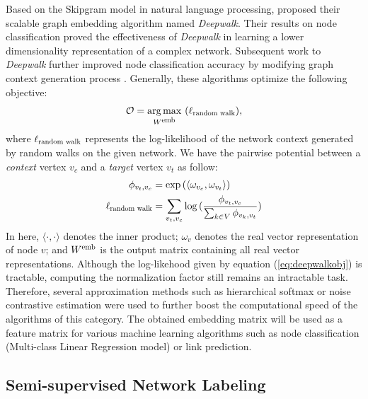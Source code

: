 \documentclass{article}
\DeclareMathOperator*{\argmax}{arg\,max}
\theoremstyle{definition}
\begin{document}
Based on the Skipgram model \cite{skipgram} in natural language 
processing, \citeauthor{deepwalk} proposed their scalable graph embedding 
algorithm named \emph{Deepwalk}. Their results on node classification proved the 
effectiveness of \emph{Deepwalk} in learning a lower dimensionality 
representation of a complex network. Subsequent work to \emph{Deepwalk} further 
improved node classification accuracy by modifying graph context 
generation process \cite{line,grarep,planetoid,node2vec}. Generally, these
algorithms optimize the following objective:
\begin{equation} 
\mathcal{O} = \argmax_{W^{\scalebox{0.75}{emb}}}\ ( 
\ell_{\scalebox{0.75}{random walk}}),
\label{eq:deepwalkobj}
\end{equation}
where $\ell_{\scalebox{0.75}{random walk}}$ represents the log-likelihood
of the network context generated by random walks on the given network. We have
the pairwise potential between a \emph{context} vertex $v_c$ and a \emph{target}
vertex $v_t$ as follow:
\begin{equation}
\begin{aligned}
	\phi_{v_t,v_c} &= \exp{( \langle \omega_{v_c} ,  \omega_{v_t} \rangle )} \\
	\ell_{\scalebox{0.75}{random walk}} &= \sum_{v_t,v_c}
	\log{(\frac{\phi_{v_t,v_c}}{\sum_{k \in V} \phi_{v_k,v_t}})}
\end{aligned}
\label{eq:deepwalkprob}
\end{equation}
In here, $\langle \cdot , \cdot \rangle$ denotes the inner product; $\omega_v$ 
denotes the real vector representation of node $v$; and $W^{\scalebox{0.75}{emb}}$
is the output matrix containing all real vector representations. Although the 
log-likehood given by equation (\ref{eq:deepwalkobj}) is tractable, computing the
normalization factor still remains an intractable task. Therefore, several 
approximation methods such as hierarchical softmax \cite{hs,deepwalk} or noise
contrastive estimation \cite{nce,node2vec} were used to further boost the
computational speed of the algorithms of this category. The obtained embedding
matrix will be used as a feature matrix for various machine learning algorithms
such as node classification (Multi-class Linear Regression model) or link 
prediction.

\subsection{Semi-supervised Network Labeling}
\end{document}
